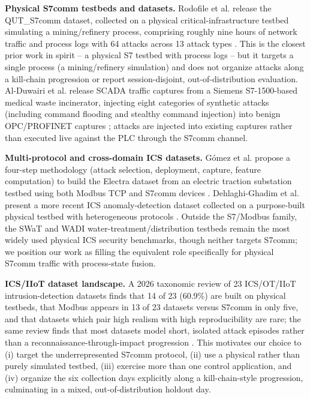\documentclass[conference]{IEEEtran}
\begin{document}
\textbf{Physical S7comm testbeds and datasets.} Rodofile et al. release the QUT\_S7comm dataset, collected on a physical critical-infrastructure testbed simulating a mining/refinery process, comprising roughly nine hours of network traffic and process logs with 64 attacks across 13 attack types \cite{rodofile2017}. This is the closest prior work in spirit -- a physical S7 testbed with process logs -- but it targets a single process (a mining/refinery simulation) and does not organize attacks along a kill-chain progression or report session-disjoint, out-of-distribution evaluation. Al-Duwairi et al. release SCADA traffic captures from a Siemens S7-1500-based medical waste incinerator, injecting eight categories of synthetic attacks (including command flooding and stealthy command injection) into benign OPC/PROFINET captures \cite{alduwairi2025}; attacks are injected into existing captures rather than executed live against the PLC through the S7comm channel.

\textbf{Multi-protocol and cross-domain ICS datasets.} G\'omez et al. propose a four-step methodology (attack selection, deployment, capture, feature computation) to build the Electra dataset from an electric traction substation testbed using both Modbus TCP and S7comm devices \cite{gomez2019electra}. Dehlaghi-Ghadim et al. present a more recent ICS anomaly-detection dataset collected on a purpose-built physical testbed with heterogeneous protocols \cite{dehlaghi2023}. Outside the S7/Modbus family, the SWaT \cite{mathur2016swat} and WADI \cite{ahmed2017wadi} water-treatment/distribution testbeds remain the most widely used physical ICS security benchmarks, though neither targets S7comm; we position our work as filling the equivalent role specifically for physical S7comm traffic with process-state fusion.

\textbf{ICS/IIoT dataset landscape.} A 2026 taxonomic review of 23 ICS/OT/IIoT intrusion-detection datasets finds that 14 of 23 (60.9\%) are built on physical testbeds, that Modbus appears in 13 of 23 datasets versus S7comm in only five, and that datasets which pair high realism with high reproducibility are rare; the same review finds that most datasets model short, isolated attack episodes rather than a reconnaissance-through-impact progression \cite{termanini2026}. This motivates our choice to (i) target the underrepresented S7comm protocol, (ii) use a physical rather than purely simulated testbed, (iii) exercise more than one control application, and (iv) organize the six collection days explicitly along a kill-chain-style progression, culminating in a mixed, out-of-distribution holdout day.
\end{document}
